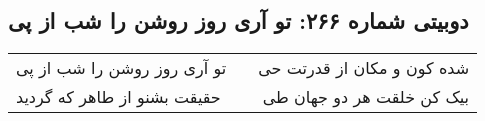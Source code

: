 \begin{center}
\section*{دوبیتی شماره ۲۶۶: تو آری روز روشن را شب از پی}
\label{sec:266}
\begin{longtable}{l p{0.5cm} r}
تو آری روز روشن را شب از پی
&&
شده کون و مکان از قدرتت حی
\\
حقیقت بشنو از طاهر که گردید
&&
بیک کن خلقت هر دو جهان طی
\\
\end{longtable}
\end{center}
